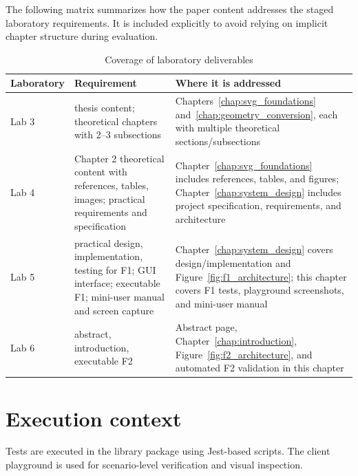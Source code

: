 The following matrix summarizes how the paper content addresses the staged laboratory requirements.
It is included explicitly to avoid relying on implicit chapter structure during evaluation.

\begin{table}[htbp]
\centering
\caption{Coverage of laboratory deliverables}
\label{tab:laboratory_deliverable_coverage}
\begin{tabular}{>{\raggedright\arraybackslash}p{2.0cm} >{\raggedright\arraybackslash}p{5.4cm} >{\raggedright\arraybackslash}p{5.4cm}}
\toprule
\textbf{Laboratory} & \textbf{Requirement} & \textbf{Where it is addressed} \\
\midrule
Lab 3 & thesis content; theoretical chapters with 2--3 subsections & Chapters~\ref{chap:svg_foundations} and~\ref{chap:geometry_conversion}, each with multiple theoretical sections/subsections \\
Lab 4 & Chapter 2 theoretical content with references, tables, images; practical requirements and specification & Chapter~\ref{chap:svg_foundations} includes references, tables, and figures; Chapter~\ref{chap:system_design} includes project specification, requirements, and architecture \\
Lab 5 & practical design, implementation, testing for F1; GUI interface; executable F1; mini-user manual and screen capture & Chapter~\ref{chap:system_design} covers design/implementation and Figure~\ref{fig:f1_architecture}; this chapter covers F1 tests, playground screenshots, and mini-user manual \\
Lab 6 & abstract, introduction, executable F2 & Abstract page, Chapter~\ref{chap:introduction}, Figure~\ref{fig:f2_architecture}, and automated F2 validation in this chapter \\
\bottomrule
\end{tabular}
\end{table}

\section{Execution context}

Tests are executed in the library package using Jest-based scripts.
The client playground is used for scenario-level verification and visual inspection.

